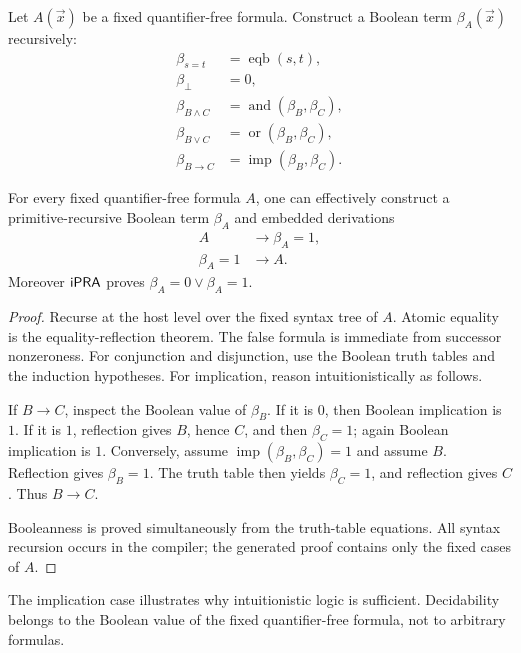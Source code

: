 Let \(A(\vec x)\) be a fixed quantifier-free formula.  Construct a Boolean term \(\beta_A(\vec x)\) recursively:
\begin{align*}
 \beta_{s=t} &= \operatorname{eqb}(s,t),\\
 \beta_{\bot} &= 0,\\
 \beta_{B\wedge C} &= \operatorname{and}(\beta_B,\beta_C),\\
 \beta_{B\vee C} &= \operatorname{or}(\beta_B,\beta_C),\\
 \beta_{B\to C} &= \operatorname{imp}(\beta_B,\beta_C).
\end{align*}

\begin{theorem}\label{thm:qf-reflection}
For every fixed quantifier-free formula \(A\), one can effectively construct a primitive-recursive Boolean term \(\beta_A\) and embedded derivations
\begin{align*}
 A &\to \beta_A=1,\\
 \beta_A=1 &\to A.
\end{align*}
Moreover \(\mathsf{iPRA}\) proves \(\beta_A=0\vee\beta_A=1\).
\end{theorem}

\begin{proof}
Recurse at the host level over the fixed syntax tree of \(A\).  Atomic equality is the equality-reflection theorem.  The false formula is immediate from successor nonzeroness.  For conjunction and disjunction, use the Boolean truth tables and the induction hypotheses.  For implication, reason intuitionistically as follows.

If \(B\to C\), inspect the Boolean value of \(\beta_B\).  If it is \(0\), then Boolean implication is \(1\).  If it is \(1\), reflection gives \(B\), hence \(C\), and then \(\beta_C=1\); again Boolean implication is \(1\).  Conversely, assume \(\operatorname{imp}(\beta_B,\beta_C)=1\) and assume \(B\).  Reflection gives \(\beta_B=1\).  The truth table then yields \(\beta_C=1\), and reflection gives \(C\).  Thus \(B\to C\).

Booleanness is proved simultaneously from the truth-table equations.  All syntax recursion occurs in the compiler; the generated proof contains only the fixed cases of \(A\).
\end{proof}

The implication case illustrates why intuitionistic logic is sufficient.  Decidability belongs to the Boolean value of the fixed quantifier-free formula, not to arbitrary formulas.

